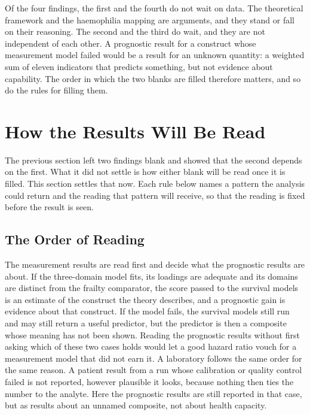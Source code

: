 Of the four findings, the first and the fourth do not wait on data. The
theoretical framework and the haemophilia mapping are arguments, and they stand or
fall on their reasoning. The second and the third do wait, and they are not
independent of each other. A prognostic result for a construct whose measurement
model failed would be a result for an unknown quantity: a weighted sum of eleven
indicators that predicts something, but not evidence about capability. The order in
which the two blanks are filled therefore matters, and so do the rules for filling
them.

\section{How the Results Will Be Read}
\label{sec:disc-reading}

\noindent The previous section left two findings blank and showed that the second
depends on the first. What it did not settle is how either blank will be read once
it is filled. This section settles that now. Each rule below names a pattern the
analysis could return and the reading that pattern will receive, so that the
reading is fixed before the result is seen.

\subsection{The Order of Reading}
\label{sec:disc-read-order}

The measurement results are read first and decide what the prognostic results are
about. If the three-domain model fits, its loadings are adequate and its domains
are distinct from the frailty comparator, the score passed to the survival models
is an estimate of the construct the theory describes, and a prognostic gain is
evidence about that construct. If the model fails, the survival models still run
and may still return a useful predictor, but the predictor is then a composite
whose meaning has not been shown. Reading the prognostic results without first
asking which of these two cases holds would let a good hazard ratio vouch for a
measurement model that did not earn it. A laboratory follows the same order for
the same reason. A patient result from a run whose calibration or quality control
failed is not reported, however plausible it looks, because nothing then ties the
number to the analyte. Here the prognostic results are still reported in that
case, but as results about an unnamed composite, not about health capacity.

